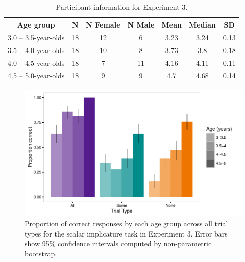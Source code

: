 \documentclass[man]{apa2}
\begin{document}
{\newpage

\begin{table}
\centering
\begin{tabular}{ccccccc}
\hline
{\bf Age group} & {\bf N} & {\bf N Female} & {\bf N Male} & {\bf Mean} &  {\bf Median} & {\bf SD} \\
\hline
3.0 -- 3.5-year-olds & 18 & 12 & 6 & 3.23 & 3.24 & 0.13\\
3.5 -- 4.0-year-olds & 18 & 10 & 8 & 3.73 & 3.8 & 0.18\\
4.0 -- 4.5-year-olds & 18 & 7 & 11 & 4.16 & 4.11 & 0.11\\
4.5 -- 5.0-year-olds & 18 & 9 & 9 & 4.7 & 4.68 & 0.14\\
\hline
\end{tabular}
\caption{\label{tab:exp_3_demo} Participant information for Experiment 3.}
\end{table}

\newpage

\begin{figure}
 \begin{center}
  \includegraphics[width=6in]{figures/exp3_SIperformance.pdf}
  \caption{\label{fig:exp3_perf} Proportion of correct responses by each age group across all trial types for the scalar implicature task in Experiment 3. Error bars show 95\% confidence intervals computed by non-parametric bootstrap.}
 \end{center}
\end{figure}

\newpage

}
\end{document}
